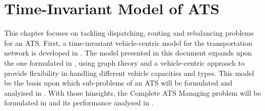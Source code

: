 \chapter{Time-Invariant Model of ATS}
This chapter focuses on tackling dispatching, routing and rebalancing problems for an ATS. First, a time-invariant vehicle-centric model for the transportation network is developed in . The model presented in this document expands upon the one formulated in \cite{project_thesis}, using graph theory and a vehicle-centric approach to provide flexibility in handling different vehicle capacities and types. This model be the basis upon which sub-problems of an ATS will be formulated and analyised in . With those hinsights, the Complete ATS Managing problem will be formulated in  and its performance analysed in . 
